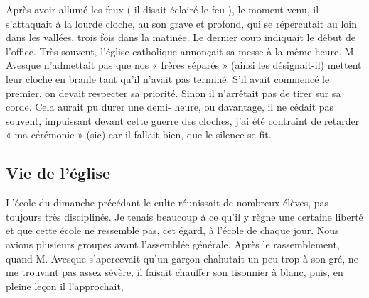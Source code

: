 Après avoir allumé les feux ( il disait éclairé le feu ), le moment venu, il s’attaquait à
la lourde cloche, au son grave et profond, qui se répercutait au loin dans les vallées,
trois fois dans la matinée. Le dernier coup indiquait le début de l’office. Très souvent,
l’église catholique annonçait sa messe à la même heure. M. Avesque n’admettait pas
que nos « frères séparés » (ainsi les désignait-il) mettent leur cloche en branle tant
qu’il n’avait pas terminé. S’il avait commencé le premier, on devait respecter sa
priorité. Sinon il n’arrêtait pas de tirer sur sa corde. Cela aurait pu durer une demi-
heure, ou davantage, il ne cédait pas souvent, impuissant devant cette guerre des
cloches, j’ai été contraint de retarder « ma cérémonie » (sic) car il fallait bien, que le
silence se fit.

\subsection*{Vie de l’église}

L’école du dimanche précédant le culte réunissait de nombreux élèves, pas toujours
très disciplinés. Je tenais beaucoup à ce qu’il y règne une certaine liberté et que cette
école ne ressemble pas, cet égard, à l’école de chaque jour. Nous avions plusieurs
groupes avant l’assemblée générale. Après le rassemblement, quand M. Avesque
s’apercevait qu’un garçon chahutait un peu trop à son gré, ne me trouvant pas assez
sévère, il faisait chauffer son tisonnier à blanc, puis, en pleine leçon il l’approchait,
